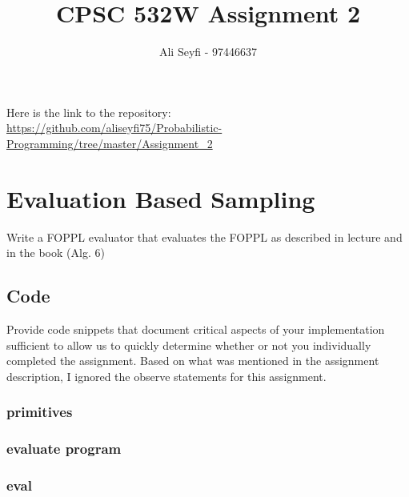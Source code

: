 \documentclass{article}
\def\blu#1{{\color{blu}#1}}
\def\red#1{{\color{red}#1}}
\begin{document}
\title{\vspace{-20mm}
CPSC 532W Assignment 2}
\author{Ali Seyfi - 97446637}
\date{}
\maketitle

Here is the link to the repository:\\
\url{https://github.com/aliseyfi75/Probabilistic-Programming/tree/master/Assignment_2}

\section{Evaluation Based Sampling}

\blu{Write a FOPPL evaluator that evaluates the FOPPL as described in lecture and in the book (Alg. 6)}

\subsection{Code}
\blu{Provide code snippets that document critical aspects of your implementation sufficient to allow us to quickly determine whether or not you individually completed the assignment.}
\red{Based on what was mentioned in the assignment description, I ignored the observe statements for this assignment.} 
\subsubsection{primitives}
\label{primitives}

\pagebreak

\pagebreak


\pagebreak
\subsubsection{evaluate program}

\subsubsection{eval}

\end{document}
